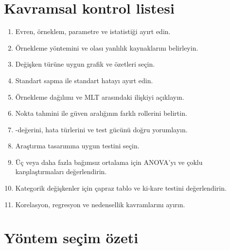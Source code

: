 \section{Kavramsal kontrol listesi}

\begin{enumerate}
  \item Evren, örneklem, parametre ve istatistiği ayırt edin.
  \item Örnekleme yöntemini ve olası yanlılık kaynaklarını belirleyin.
  \item Değişken türüne uygun grafik ve özetleri seçin.
  \item Standart sapma ile standart hatayı ayırt edin.
  \item Örnekleme dağılımı ve MLT arasındaki ilişkiyi açıklayın.
  \item Nokta tahmini ile güven aralığının farklı rollerini belirtin.
  \item \pval-değerini, hata türlerini ve test gücünü doğru yorumlayın.
  \item Araştırma tasarımına uygun \tstat testini seçin.
\ifimoders\else
  \item Üç veya daha fazla bağımsız ortalama için ANOVA'yı ve çoklu karşılaştırmaları değerlendirin.
\fi
  \item Kategorik değişkenler için çapraz tablo ve ki-kare testini değerlendirin.
  \item Korelasyon, regresyon ve nedensellik kavramlarını ayırın.
\end{enumerate}


\section{Yöntem seçim özeti}
\label{sec:method-summary}

